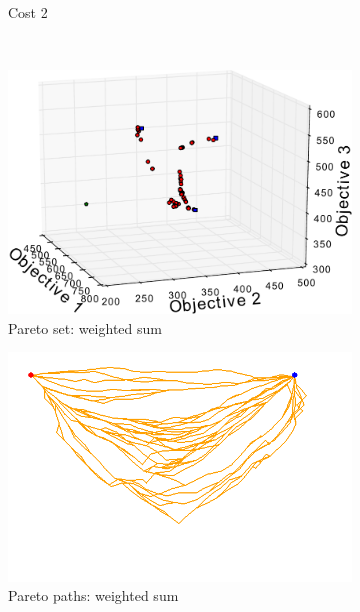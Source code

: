 \documentclass{article}
\begin{document}
\begin{figure}
\begin{subfigure}[b]{0.31\linewidth}
		\caption{Cost 2}
		\label{fig:sim:many:fitness2}
	\end{subfigure}  \\
	\begin{subfigure}[b]{0.45\linewidth}
		\centering
		\includegraphics[width=\textwidth]{fig/sim6-3obj/PF06-MORRT.pdf}
		\caption{Pareto set: weighted sum}
		\label{fig:sim:many:pf:a}
	\end{subfigure}
	\begin{subfigure}[b]{0.45\linewidth}
		\centering
		\includegraphics[width=\textwidth]{fig/sim6-3obj/MORRTstar02-ALL.png}
		\caption{Pareto paths: weighted sum}
		\label{fig:sim:many:sols:a}
	\end{subfigure}  \\
	\begin{subfigure}[b]{0.45\linewidth}
		\centering

\end{subfigure}
\end{figure}
\end{document}
